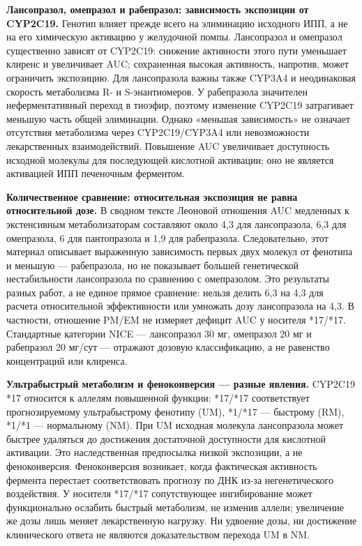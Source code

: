 \documentclass[11pt,a4paper,notitlepage]{report}
\newcommand{\src}[1]{\unskip\space\cite{#1}}
\begin{document}
\textbf{Лансопразол, омепразол и рабепразол: зависимость экспозиции от CYP2C19.} Генотип влияет прежде всего на элиминацию исходного ИПП, а не на его химическую активацию у желудочной помпы. Лансопразол и омепразол существенно зависят от CYP2C19: снижение активности этого пути уменьшает клиренс и увеличивает AUC; сохраненная высокая активность, напротив, может ограничить экспозицию. Для лансопразола важны также CYP3A4 и неодинаковая скорость метаболизма R- и S-энантиомеров. У рабепразола значителен неферментативный переход в тиоэфир, поэтому изменение CYP2C19 затрагивает меньшую часть общей элиминации. Однако «меньшая зависимость» не означает отсутствия метаболизма через CYP2C19/CYP3A4 или невозможности лекарственных взаимодействий. Повышение AUC увеличивает доступность исходной молекулы для последующей кислотной активации; оно не является активацией ИПП печеночным ферментом.\src{leonova2015,molp450,molchem,cpic}

\textbf{Количественное сравнение: относительная экспозиция не равна относительной дозе.} В сводном тексте Леоновой отношения AUC медленных к экстенсивным метаболизаторам составляют около 4,3 для лансопразола, 6,3 для омепразола, 6 для пантопразола и 1,9 для рабепразола. Следовательно, этот материал описывает выраженную зависимость первых двух молекул от фенотипа и меньшую --- рабепразола, но не показывает большей генетической нестабильности лансопразола по сравнению с омепразолом. Это результаты разных работ, а не единое прямое сравнение: нельзя делить 6,3 на 4,3 для расчета относительной эффективности или умножать дозу лансопразола на 4,3. В частности, отношение PM/EM не измеряет дефицит AUC у носителя *17/*17. Стандартные категории NICE --- лансопразол 30 мг, омепразол 20 мг и рабепразол 20 мг/сут --- отражают дозовую классификацию, а не равенство концентраций или клиренса.\src{leonova2015,cpic,nice}

\textbf{Ультрабыстрый метаболизм и феноконверсия --- разные явления.} CYP2C19 *17 относится к аллелям повышенной функции: *17/*17 соответствует прогнозируемому ультрабыстрому фенотипу (UM), *1/*17 --- быстрому (RM), *1/*1 --- нормальному (NM). При UM исходная молекула лансопразола может быстрее удаляться до достижения достаточной доступности для кислотной активации. Это наследственная предпосылка низкой экспозиции, а не феноконверсия. Феноконверсия возникает, когда фактическая активность фермента перестает соответствовать прогнозу по ДНК из-за негенетического воздействия. У носителя *17/*17 сопутствующее ингибирование может функционально ослабить быстрый метаболизм, не изменив аллели; увеличение же дозы лишь меняет лекарственную нагрузку. Ни удвоение дозы, ни достижение клинического ответа не являются доказательством перехода UM в NM.\src{cpic,molfluvox}
\end{document}
